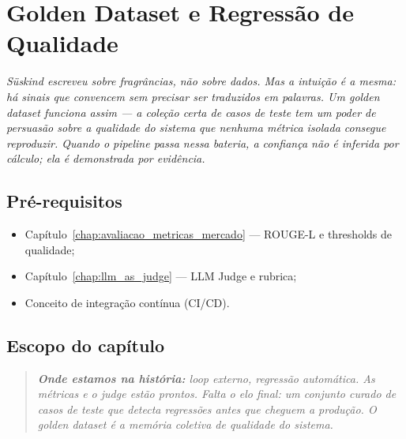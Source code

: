 \chapter{Golden Dataset e Regress\~ao de Qualidade}
\label{chap:golden_dataset_regressao}

{\small\itshape\color{AccentGray}
S\"uskind escreveu sobre fragr\^ancias, n\~ao sobre dados. Mas a intui\c{c}\~ao \'{e} a mesma: h\'{a} sinais que convencem sem precisar ser traduzidos em palavras. Um \textit{golden dataset} funciona assim --- a cole\c{c}\~ao certa de casos de teste tem um poder de persu\textit{as}\~ao sobre a qualidade do sistema que nenhuma m\'{e}trica isolada consegue reproduzir. Quando o pipeline passa nessa bateria, a confian\c{c}a n\~ao \'{e} inferida por c\'{a}lculo; ela \'{e} demonstrada por evid\^encia.\par}
\vspace{0.6em}
\section{Pr\'e-requisitos}

\begin{itemize}[leftmargin=*]
  \item Cap\'itulo~\ref{chap:avaliacao_metricas_mercado} ---
        ROUGE-L e thresholds de qualidade;
  \item Cap\'itulo~\ref{chap:llm_as_judge} --- LLM Judge e rubrica;
  \item Conceito de integra\c{c}\~ao cont\'inua (CI/CD).
\end{itemize}

\section{Escopo do cap\'itulo}

\begin{quote}\itshape
\textbf{Onde estamos na hist\'oria:} loop externo, regress\~ao
autom\'atica. As m\'etricas e o judge est\~ao prontos. Falta o
elo final: um conjunto curado de casos de teste que detecta
regress\~oes antes que cheguem a produ\c{c}\~ao. O golden dataset
\'e a mem\'oria coletiva de qualidade do sistema.
\end{quote}

